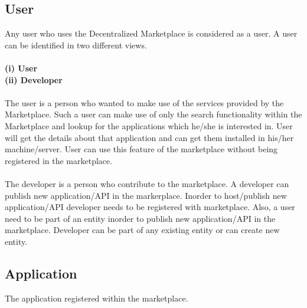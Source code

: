 \subsection{User}
Any user who uses the Decentralized Marketplace is considered as a user. A user can be identified in two different views.\\
\\
\textbf{(i) User}\\
\textbf{(ii) Developer}\\
\\
The user is a person who wanted to make use of the services provided by the Marketplace. Such a user can make use of only the search functionality within the Marketplace and lookup for the applications which he/she is interested in. User will get the details about that application and can get them installed in his/her machine/server. User can use this feature of the marketplace without being registered in the marketplace.
\\
\\
The developer is a person who contribute to the marketplace. A developer can publish new application/API in the markerplace. Inorder to host/publish new application/API developer needs to be registered with marketplace. Also, a user need to be part of an entity inorder to publish new application/API in the marketplace. Developer can be part of any existing entity or can create new entity.
\subsection{Application}
The application registered within the marketplace.

